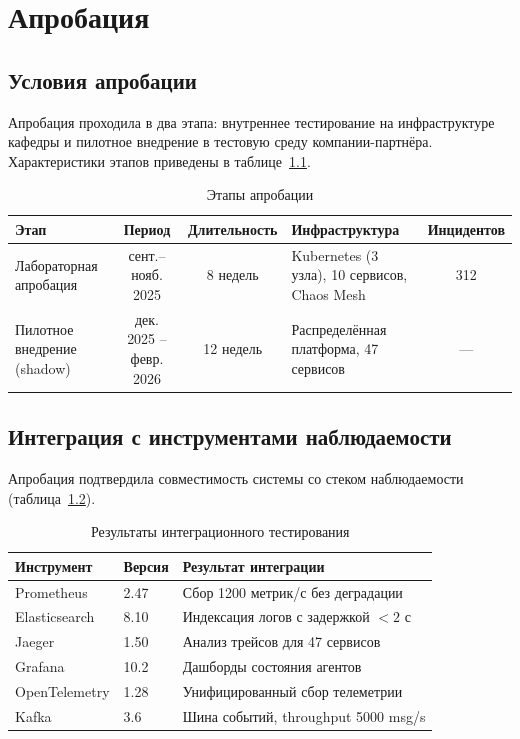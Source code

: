 \chapter{Апробация}

\section{Условия апробации}

Апробация проходила в два этапа: внутреннее тестирование на инфраструктуре кафедры и пилотное внедрение в тестовую среду компании-партнёра. Характеристики этапов приведены в таблице~\ref{tab:aprobation_stages}.

\begin{table}[H]
\centering
\caption{Этапы апробации}
\label{tab:aprobation_stages}
\small
\begin{tabular}{|p{2.8cm}|c|c|p{3.8cm}|c|}
\hline
\textbf{Этап} & \textbf{Период} & \textbf{Длительность} & \textbf{Инфраструктура} & \textbf{Инцидентов} \\
\hline
Лабораторная апробация & сент.--нояб. 2025 & 8 недель & Kubernetes (3 узла), 10 сервисов, Chaos Mesh & 312 \\
\hline
Пилотное внедрение (shadow) & дек. 2025 -- февр. 2026 & 12 недель & Распределённая платформа, 47 сервисов & --- \\
\hline
\end{tabular}
\end{table}

\section{Интеграция с инструментами наблюдаемости}

Апробация подтвердила совместимость системы со стеком наблюдаемости (таблица~\ref{tab:integration_results}).

\begin{table}[H]
\centering
\caption{Результаты интеграционного тестирования}
\label{tab:integration_results}
\small
\begin{tabular}{|p{3.5cm}|p{3cm}|p{5cm}|}
\hline
\textbf{Инструмент} & \textbf{Версия} & \textbf{Результат интеграции} \\
\hline
Prometheus & 2.47 & Сбор 1200 метрик/с без деградации \\
\hline
Elasticsearch & 8.10 & Индексация логов с задержкой $< 2$ с \\
\hline
Jaeger & 1.50 & Анализ трейсов для 47 сервисов \\
\hline
Grafana & 10.2 & Дашборды состояния агентов \\
\hline
OpenTelemetry & 1.28 & Унифицированный сбор телеметрии \\
\hline
Kafka & 3.6 & Шина событий, throughput 5000 msg/s \\
\hline
\end{tabular}
\end{table}

